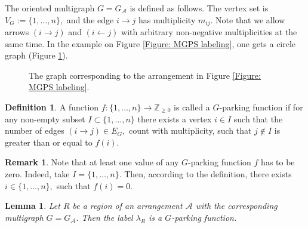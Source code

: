 \documentclass[12pt]{amsart}
\newcommand{\ZZ}{\mathbb{Z}_{\ge 0}}
\newtheorem{lemma}{Lemma}[section]
\theoremstyle{definition}
\newtheorem{definition}{Definition}[section]
\newtheorem{remark}{Remark}
\begin{document}
The oriented multigraph $G=G_{\mathcal A}$ is defined as follows. The vertex set is $V_G:=\{1,\ldots, n\},$ and the edge $i\rightarrow j$ has multiplicity $m_{ij}.$ Note that we allow arrows $(i\rightarrow j)$ and $(i\leftarrow j)$ with arbitrary non-negative multiplicities at the same time. In the example on Figure \ref{Figure: MGPS labeling}, one gets a circle graph (Figure \ref{Figure: cycle graph}).

\begin{figure}
\begin{center}
\end{center}
\caption{The graph corresponding to the arrangement in Figure \ref{Figure: MGPS labeling}.}\label{Figure: cycle graph}
\end{figure}


\begin{definition}
A function $f:\{1,\ldots,n\}\to\ZZ$ is called a {$G$-parking function} if for any non-empty subset $I\subset\{1,\ldots,n\}$ there exists a vertex $i\in I$ such that the number of edges $(i\rightarrow j)\in E_G,$ count with multiplicity, such that $j\notin I$ is greater than or equal to $f(i).$
\end{definition}

\begin{remark}
Note that at least one value of any $G$-parking function $f$ has to be zero. Indeed, take $I=\{1,\ldots,n\}.$ Then, according to the definition, there exists $i\in\{1,\ldots,n\},$ such that $f(i)=0.$ 
\end{remark}

\begin{lemma}
Let $R$ be a region of an arrangement ${\mathcal A}$ with the corresponding multigraph $G=G_{\mathcal A}.$ Then the label $\lambda_R$ is a $G$-parking function.
\end{lemma}
\end{document}
